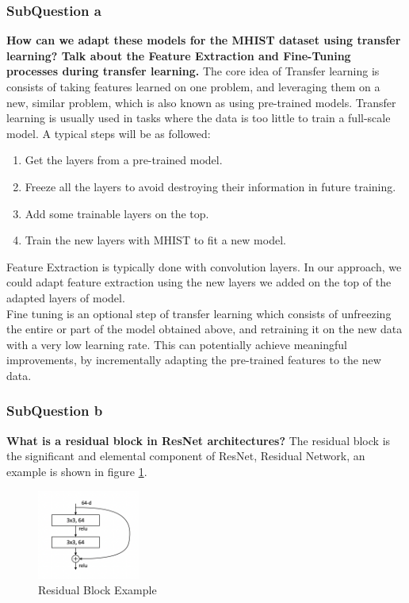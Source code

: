 \documentclass[conference]{IEEEtran}
\begin{document}
\subsubsection{SubQuestion a} \textbf{How can we adapt these models for the MHIST dataset using transfer learning? Talk about the Feature Extraction and Fine-Tuning processes during transfer learning.} 
The core idea of Transfer learning is consists of taking features learned on one problem, and leveraging them on a new, similar problem, which is also known as using pre-trained models. Transfer learning is usually used in tasks where the data is too little to train a full-scale model.\cite{keras} A typical steps will be as followed:
\begin{enumerate}
  \item Get the layers from a pre-trained model.
  \item Freeze all the layers to avoid destroying their information in future training.
  \item Add some trainable layers on the top.
  \item Train the new layers with MHIST to fit a new model.
\end{enumerate}
Feature Extraction is typically done with convolution layers. In our approach, we could adapt feature extraction using the new layers we added on the top of the adapted layers of model.
\\Fine tuning is an optional step of transfer learning which consists of unfreezing the entire or part of the model obtained above, and retraining it on the new data with a very low learning rate. This can potentially achieve meaningful improvements, by incrementally adapting the pre-trained features to the new data.\cite{keras}\cite{blog}
\subsubsection{SubQuestion b} \textbf{What is a residual block in ResNet architectures?}
The residual block is the significant and elemental component of ResNet, Residual Network, an example is shown in figure \ref{res}.

\begin{figure}[h] 
    \centering
    \includegraphics[width=0.3\textwidth]{./graphs/Task2/res-block.png}
    \caption{Residual Block Example}
    \label{res}
\end{figure}
\end{document}
